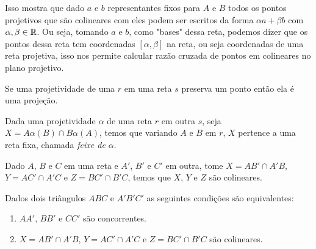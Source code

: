 Isso mostra que dado $a$ e $b$ representantes fixos para $A$ e $B$ todos os pontos projetivos que são colineares com eles podem ser escritos da forma $\alpha a + \beta b$ com $\alpha,\beta \in \mathbb{R}$. Ou seja, tomando $a$ e $b$, como "bases" dessa reta, podemos dizer que os pontos dessa reta tem coordenadas $[\alpha,\beta]$ na reta, ou seja coordenadas de uma reta projetiva, isso nos permite calcular razão cruzada de pontos em colineares no plano projetivo.

\begin{lem}
Se uma projetividade de uma $r$ em uma reta $s$ preserva um ponto então ela é uma projeção.
\end{lem}
\begin{thm}
Dada uma projetividade $\alpha$ de uma reta $r$ em outra $s$, seja $X = A\alpha(B) \cap B\alpha(A)$, temos que variando $A$ e $B$ em $r$, $X$ pertence a uma reta fixa, chamada \emph{feixe de $\alpha$}.
\end{thm}
\begin{cor}
Dado $A$, $B$ e $C$ em uma reta e $A'$, $B'$ e $C'$ em outra, tome $X = AB' \cap A'B$, $Y = AC'\cap A'C$ e $Z = BC' \cap B'C$, temos que $X$, $Y$ e $Z$ são colineares.

\end{cor}
\begin{thm}
Dados dois triângulos $ABC$ e $A'B'C'$ as seguintes condições são equivalentes:
\begin{enumerate}
    \item $AA'$, $BB'$ e $CC'$ são concorrentes.
    \item $X = AB' \cap A'B$, $Y = AC'\cap A'C$ e $Z = BC' \cap B'C$ são colineares.
\end{enumerate}


\end{thm}